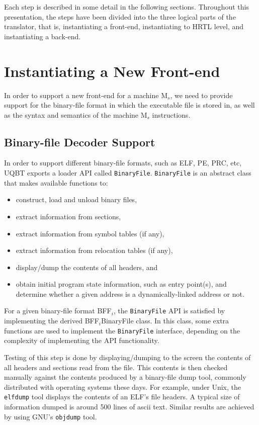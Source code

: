 Each step is described in some detail in the following sections.
Throughout this presentation, the steps have been divided into 
the three logical parts of the translator, that is, instantiating
a front-end, instantiating to HRTL level, and instantiating
a back-end.


\section{Instantiating a New Front-end}
In order to support a new front-end for a machine M$_s$, we 
need to provide support for the binary-file format in which 
the executable file is stored in, as well as the syntax and 
semantics of the machine M$_s$ instructions.  

\subsection{Binary-file Decoder Support}
In order to support different binary-file formats, such as 
ELF, PE, PRC, etc, UQBT exports a loader API called 
\texttt{BinaryFile}.  \texttt{BinaryFile} is an abstract class 
that makes available functions to:

\begin{itemize}
\item construct, load and unload binary files, 
\item extract information from sections, 
\item extract information from symbol tables (if any), 
\item extract information from relocation tables (if any),
\item display/dump the contents of all headers, and 
\item obtain initial program state information, such as entry 
	point(s), and determine whether a given address is a dynamically-linked 
	address or not.  
\end{itemize}

For a given binary-file format BFF$_i$, the \texttt{BinaryFile} 
API is satisfied by implementing the derived BFF$_i$BinaryFile 
class.  In this class, some extra functions are used to 
implement the \texttt{BinaryFile} interface, depending on 
the complexity of implementing the API functionality.  

Testing of this step is done by displaying/dumping to the screen 
the contents of all headers and sections read from the file. 
This contents is then checked manually against the contents 
produced by a binary-file dump tool, commonly distributed with
operating systems these days.  For example, under Unix, the  
\texttt{elfdump} tool displays the contents of an ELF's file 
headers.  A typical size of information dumped is around 500 
lines of ascii text.  Similar results are achieved by using 
GNU's \texttt{objdump} tool. 


